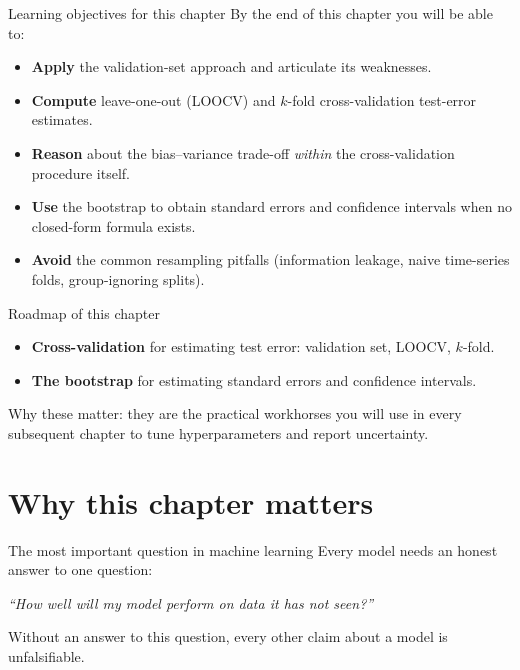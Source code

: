 \documentclass[aspectratio=169,11pt]{beamer}
\begin{document}
\begin{frame}{Learning objectives for this chapter}
  By the end of this chapter you will be able to:
  \begin{itemize}
    \item \textbf{Apply} the validation-set approach and articulate
          its weaknesses.
    \item \textbf{Compute} leave-one-out (LOOCV) and $k$-fold
          cross-validation test-error estimates.
    \item \textbf{Reason} about the bias--variance trade-off
          \emph{within} the cross-validation procedure itself.
    \item \textbf{Use} the bootstrap to obtain standard errors and
          confidence intervals when no closed-form formula exists.
    \item \textbf{Avoid} the common resampling pitfalls (information
          leakage, naive time-series folds, group-ignoring splits).
  \end{itemize}
\end{frame}


\begin{frame}{Roadmap of this chapter}
  \begin{takeaway}
    \begin{itemize}
      \item \textbf{Cross-validation} for estimating test error:
            validation set, LOOCV, $k$-fold.
      \item \textbf{The bootstrap} for estimating standard errors and
            confidence intervals.
    \end{itemize}
  \end{takeaway}
  Why these matter: they are the practical workhorses you will use in
  every subsequent chapter to tune hyperparameters and report
  uncertainty.
\end{frame}

\section{Why this chapter matters}

\begin{frame}{The most important question in machine learning}
  Every model needs an honest answer to one question:
  \begin{takeaway}
    \emph{``How well will my model perform on data it has not seen?''}
  \end{takeaway}
  Without an answer to this question, every other claim about a model
  is unfalsifiable.
\end{frame}
\end{document}
